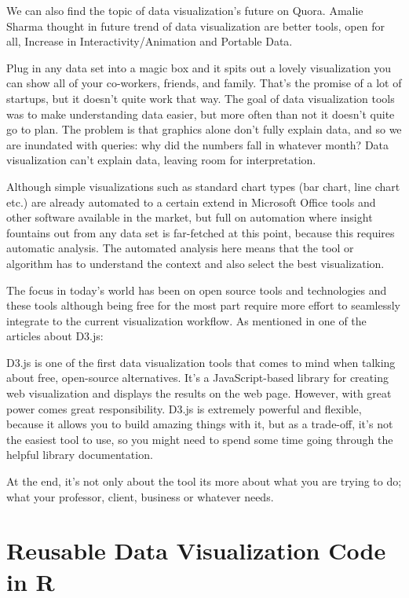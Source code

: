 \documentclass[]{book}
\theoremstyle{definition}
\theoremstyle{definition}
\theoremstyle{definition}
\theoremstyle{remark}
\begin{document}
We can also find the topic of data visualization's future on Quora.
Amalie Sharma thought in future trend of data visualization are better
tools, open for all, Increase in Interactivity/Animation and Portable
Data.

Plug in any data set into a magic box and it spits out a lovely
visualization you can show all of your co-workers, friends, and family.
That's the promise of a lot of startups, but it doesn't quite work that
way. The goal of data visualization tools was to make understanding data
easier, but more often than not it doesn't quite go to plan. The problem
is that graphics alone don't fully explain data, and so we are inundated
with queries: why did the numbers fall in whatever month? Data
visualization can't explain data, leaving room for interpretation.

Although simple visualizations such as standard chart types (bar chart,
line chart etc.) are already automated to a certain extend in Microsoft
Office tools and other software available in the market, but full on
automation where insight fountains out from any data set is far-fetched
at this point, because this requires automatic analysis. The automated
analysis here means that the tool or algorithm has to understand the
context and also select the best visualization.

The focus in today's world has been on open source tools and
technologies and these tools although being free for the most part
require more effort to seamlessly integrate to the current visualization
workflow. As mentioned in one of the articles about D3.js:

D3.js is one of the first data visualization tools that comes to mind
when talking about free, open-source alternatives. It's a
JavaScript-based library for creating web visualization and displays the
results on the web page. However, with great power comes great
responsibility. D3.js is extremely powerful and flexible, because it
allows you to build amazing things with it, but as a trade-off, it's not
the easiest tool to use, so you might need to spend some time going
through the helpful library documentation.

At the end, it's not only about the tool its more about what you are
trying to do; what your professor, client, business or whatever needs.

\section{Reusable Data Visualization Code in
R}\label{reusable-data-visualization-code-in-r}
\end{document}
